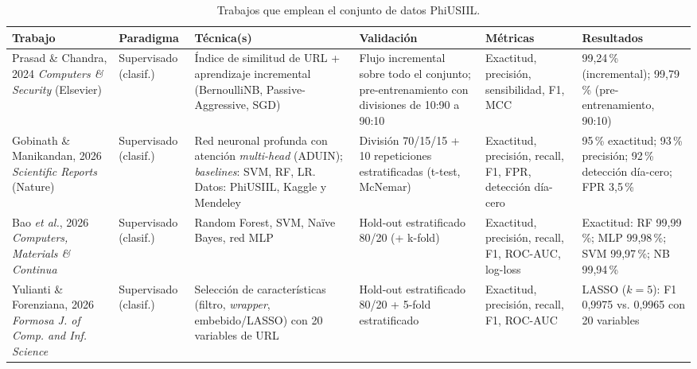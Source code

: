 \documentclass[conference]{IEEEtran}
\begin{document}
\begin{table}[t]
\centering
\caption{Trabajos que emplean el conjunto de datos PhiUSIIL.}
\label{tab:sota}
\small
\begin{tabular}{p{2.6cm} p{1.6cm} p{3.0cm} p{2.6cm} p{2.4cm} p{2.6cm}}
\toprule
\textbf{Trabajo} & \textbf{Paradigma} & \textbf{Técnica(s)} & \textbf{Validación} & \textbf{Métricas} & \textbf{Resultados} \\
\midrule
Prasad \& Chandra, 2024 \cite{prasad2024} \newline \textit{Computers \& Security} (Elsevier) &
Supervisado (clasif.) &
Índice de similitud de URL + aprendizaje incremental (BernoulliNB, Passive-Aggressive, SGD) &
Flujo incremental sobre todo el conjunto; pre-entrenamiento con divisiones de 10:90 a 90:10 &
Exactitud, precisión, sensibilidad, F1, MCC &
99,24\,\% (incremental); 99,79\,\% (pre-entrenamiento, 90:10) \\
\addlinespace
Gobinath \& Manikandan, 2026 \cite{gobinath2026} \newline \textit{Scientific Reports} (Nature) &
Supervisado (clasif.) &
Red neuronal profunda con atención \textit{multi-head} (ADUIN); \textit{baselines}: SVM, RF, LR. Datos: PhiUSIIL, Kaggle y Mendeley &
División 70/15/15 + 10 repeticiones estratificadas (t-test, McNemar) &
Exactitud, precisión, recall, F1, FPR, detección día-cero &
95\,\% exactitud; 93\,\% precisión; 92\,\% detección día-cero; FPR 3,5\,\% \\
\addlinespace
Bao \textit{et al.}, 2026 \cite{bao2026} \newline \textit{Computers, Materials \& Continua} &
Supervisado (clasif.) &
Random Forest, SVM, Naïve Bayes, red MLP &
Hold-out estratificado 80/20 (+ k-fold) &
Exactitud, precisión, recall, F1, ROC-AUC, log-loss &
Exactitud: RF 99,99\,\%; MLP 99,98\,\%; SVM 99,97\,\%; NB 99,94\,\% \\
\addlinespace
Yulianti \& Forenziana, 2026 \cite{yulianti2026} \newline \textit{Formosa J. of Comp. and Inf. Science} &
Supervisado (clasif.) &
Selección de características (filtro, \textit{wrapper}, embebido/LASSO) con 20 variables de URL &
Hold-out estratificado 80/20 + 5-fold estratificado &
Exactitud, precisión, recall, F1, ROC-AUC &
LASSO ($k{=}5$): F1 0,9975 vs. 0,9965 con 20 variables \\
\bottomrule
\end{tabular}
\end{table}
\end{document}
